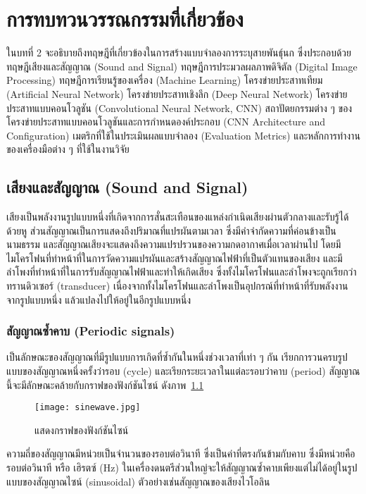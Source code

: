 \chapter{การทบทวนวรรณกรรมที่เกี่ยวข้อง}
\label{chapter:literature-review}

ในบทที่ 2 จะอธิบายถึงทฤษฎีที่เกี่ยวข้องในการสร้างแบบจำลองการระบุสายพันธุ์นก
ซึ่งประกอบด้วย ทฤษฎีเสียงและสัญญาณ (Sound and Signal) 
ทฤษฎีการประมวลผลภาพดิจิตัล (Digital Image Processing) ทฤษฎีการเรียนรู้ของเครื่อง (Machine Learning)
โครงข่ายประสาทเทียม (Artificial Neural Network) โครงข่ายประสาทเชิงลึก (Deep Neural Network) 
โครงข่ายประสาทแบบคอนโวลูชัน (Convolutional Neural Network, CNN) สถาปัตยกรรมต่าง ๆ ของโครงข่ายประสาทแบบคอนโวลูชันและการกำหนดองค์ประกอบ (CNN Architecture and Configuration)
เมตริกที่ใช้ในประเมินผลแบบจำลอง (Evaluation Metrics) และหลักการทำงานของเครื่องมือต่าง ๆ ที่ใช้ในงานวิจัย

\section{เสียงและสัญญาณ (Sound and Signal)}
เสียงเป็นพลังงานรูปแบบหนึ่งที่เกิดจากการสั่นสะเทือนของแหล่งกำเนิดเสียงผ่านตัวกลางและรับรู้ได้ด้วยหู ส่วนสัญญาณเป็นการแสดงถึงปริมาณที่แปรผันตามเวลา
ซึ่งมีคำจำกัดความที่ค่อนข้างเป็นนามธรรม และสัญญาณเสียงจะแสดงถึงความแปรปรวนของความกดอากาศเมื่อเวลาผ่านไป 
โดยมีไมโครโฟนที่ทำหน้าที่ในการวัดความแปรผันและสร้างสัญญาณไฟฟ้าที่เป็นตัวแทนของเสียง
และมีลำโพงที่ทำหน้าที่ในการรับสัญญาณไฟฟ้าและทำให้เกิดเสียง ซึ่งทั้งไมโครโฟนและลำโพงจะถูกเรียกว่า 
ทรานดิวเซอร์ (transducer) เนื่องจากทั้งไมโครโฟนและลำโพงเป็นอุปกรณ์ที่ทำหน้าที่รับพลังงานจากรูปแบบหนึ่ง
แล้วแปลงไปให้อยู่ในอีกรูปแบบหนึ่ง

\subsection{สัญญาณซ้ำคาบ (Periodic signals)}
เป็นลักษณะของสัญญาณที่มีรูปแบบการเกิดที่ซ้ำกันในหนึ่งช่วงเวลาที่เท่า ๆ กัน เรียกการวนครบรูปแบบของสัญญาณหนึ่งครั้งว่ารอบ (cycle) 
และเรียกระยะเวลาในแต่ละรอบว่าคาบ (period)  สัญญาณนี้จะมีลักษณะคล้ายกับกราฟของฟังก์ชันไซน์ ดังภาพ~\ref{Fig:Sine_wave}

\begin{figure}[h]
    \centering
    \texttt{[image: sinewave.jpg]}
    \caption{แสดงกราฟของฟังก์ชันไซน์}
    \label{Fig:Sine_wave}
\end{figure}

ความถี่ของสัญญาณมีหน่วยเป็นจำนวนของรอบต่อวินาที ซึ่งเป็นค่าที่ตรงกันข้ามกับคาบ ซึ่งมีหน่วยคือ รอบต่อวินาที หรือ เฮิรตซ์ (Hz) 
ในเครื่องดนตรีส่วนใหญ่จะให้สัญญาณซ้ำคาบเพียงแต่ไม่ได้อยู่ในรูปแบบของสัญญาณไซน์ (sinusoidal) 
ตัวอย่างเช่นสัญญาณของเสียงไวโอลิน


